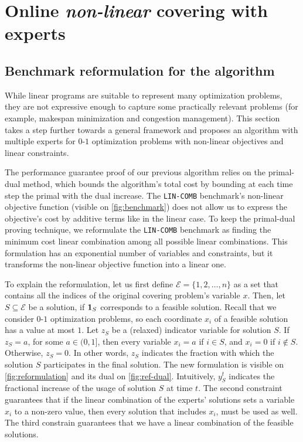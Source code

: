
\section{Online \emph{non-linear} covering with experts} \label{sec:convex-full}

\subsection{Benchmark reformulation for the algorithm}

While linear programs are suitable to represent many optimization problems, they are not expressive enough to capture some practically relevant problems (for example, makespan minimization and congestion management). This section takes a step further towards a general framework and proposes an algorithm with multiple experts for $0$-$1$ optimization problems with non-linear objectives and linear constraints.

The performance guarantee proof of our previous algorithm relies on the primal-dual method, which bounds the algorithm's total cost by bounding at each time step the primal with the dual increase.
The \texttt{LIN-COMB} benchmark's non-linear objective function (visible on \cref{fig:benchmark}) does not allow us to express the objective's cost by additive terms like in the linear case. To keep the primal-dual proving technique, we reformulate the \texttt{LIN-COMB} benchmark as finding the minimum cost linear combination among all possible linear combinations. This formulation has an exponential number of variables and constraints, but it transforms the non-linear objective function into a linear one.

To explain the reformulation, let us first define $\mathcal{E} = \{1,2,\dots,n\}$ as a set that contains all the indices of the original covering problem's variable $x$. Then, let $S \subseteq \mathcal{E}$ be a solution, if $\mathbf{1}_{S}$ corresponds to a feasible solution. Recall that we consider $0$-$1$ optimization problems, so each coordinate $x_i$ of a feasible solution has a value at most $1$. Let $z_{S}$ be a (relaxed) indicator variable for solution $S$. If $z_{S} = a$, for some $a \in (0,1]$, then every variable $x_{i} = a$ if $i \in S$, and $x_{i} = 0$ if $i \notin S$. Otherwise, $z_S = 0$. In other words, $z_{S}$ indicates the fraction with which the solution $S$ participates in the final solution. The new formulation is visible on \cref{fig:reformulation} and its dual on \cref{fig:ref-dual}. Intuitively, $y_S^{t}$ indicates the fractional increase of the usage of solution $S$ at time $t$. The second constraint guarantees that if the linear combination of the experts' solutions sets a variable $x_i$ to a non-zero value, then every solution that includes $x_i$, must be used as well. The third constrain guarantees that we have a linear combination of the feasible solutions.

